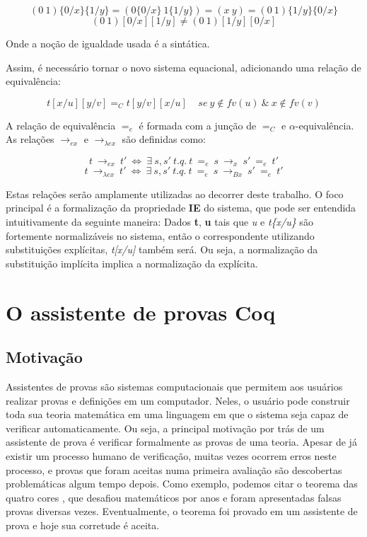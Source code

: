\[ (0\ 1) \{0/x\}\{1/y\} = (0\{0/x\}\ 1\{1/y\}) = (x\ y) =  (0\ 1) \{1/y\}\{0/x\} \]
\[ (0\ 1) [0/x][1/y] \neq  (0\ 1) [1/y][0/x] \]

Onde a noção de igualdade usada é a sintática.

Assim, é necessário tornar o novo sistema
equacional, adicionando uma relação de equivalência:

\[ t[x/u][y/v] =_C t[y/v][x/u] \ \ \ \ \ se\ y \notin fv(u)\ \&\ x \notin fv(v)\] 

A relação de equivalência $=_e$ é formada com a junção de $=_C$ e
$\alpha$-equivalência. As relações $\rightarrow_{ex}$ e $\rightarrow_{\lambda
    ex}$ são definidas como:

\[t\ \rightarrow_{ex}\ t'\ \iff\ \exists\ s,s'\ t.q.\ t\ =_{e}\ s\
    \rightarrow_x\ s'\ =_e\ t' \]
\[t\ \rightarrow_{\lambda ex}\ t'\ \iff\ \exists\ s,s'\ t.q.\ t\ =_{e}\ s\
    \rightarrow_{Bx}\ s'\ =_e\ t' \]

Estas relações serão amplamente utilizadas ao decorrer deste trabalho. 
O foco principal é a formalização da propriedade \textbf{IE} do sistema, que
pode ser entendida intuitivamente da seguinte maneira: Dados \textbf{t},
\textbf{u} tais que \emph{u} e \emph{t\{x/u\}} são fortemente normalizáveis
no sistema, então o correspondente utilizando substituições explícitas,
\emph{t[x/u]} também será. Ou seja, a normalização da substituição implícita
implica a normalização da explícita.


\section{O assistente de provas Coq} 
\subsection{Motivação}

Assistentes de provas são sistemas computacionais que permitem aos usuários
realizar provas e definições em um computador. Neles, o usuário pode construir
toda sua teoria matemática em uma linguagem em que o sistema seja capaz de
verificar automaticamente. Ou seja, a principal motivação por trás de um
assistente de prova é verificar formalmente as provas de uma teoria. Apesar de
já existir um processo humano de verificação, muitas vezes ocorrem erros neste
processo, e provas que foram aceitas numa primeira avaliação são descobertas
problemáticas algum tempo depois. Como exemplo, podemos citar o teorema das
quatro cores \cite{four_colour}, que desafiou matemáticos por anos e foram
apresentadas falsas provas diversas vezes. Eventualmente, o teorema foi provado
em um assistente de prova e hoje sua corretude é aceita.

